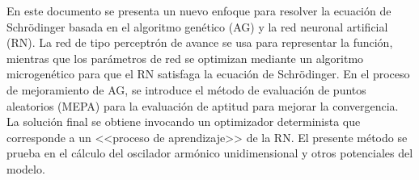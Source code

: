 En este documento se presenta un nuevo enfoque para resolver la ecuaci\'on de
Schr\"odinger basada en el algoritmo gen\'etico (AG) y la red
neuronal artificial (RN). La red de tipo perceptr\'on de
avance se usa para representar la funci\'on, mientras que
los par\'ametros de red se optimizan mediante un algoritmo
microgen\'etico para que el RN satisfaga la ecuaci\'on de
Schr\"odinger.
En el proceso de mejoramiento de AG, se introduce el
m\'etodo de evaluaci\'on de puntos aleatorios (MEPA) para la
evaluaci\'on de aptitud para mejorar la convergencia. La
soluci\'on final se obtiene invocando un optimizador
determinista que corresponde a un <<proceso de aprendizaje>>
de la RN. El presente m\'etodo se prueba en el c\'alculo del
oscilador arm\'onico unidimensional y otros potenciales del
modelo.